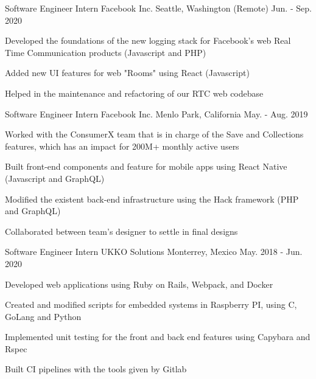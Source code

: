 \begin{cventries}
  \cventry
    {Software Engineer Intern} %
    {Facebook Inc.} %
    {Seattle, Washington (Remote)} %
    {Jun. - Sep. 2020} %
    {
      \begin{cvitems} %
        \item {Developed the foundations of the new logging stack for Facebook's web Real Time Communication products (Javascript and PHP)}
        \item {Added new UI features for web "Rooms" using React (Javascript)}
        \item {Helped in the maintenance and refactoring of our RTC web codebase}
      \end{cvitems}
    }
  \cventry
    {Software Engineer Intern} %
    {Facebook Inc.} %
    {Menlo Park, California} %
    {May. - Aug. 2019} %
    {
      \begin{cvitems} %
        \item {Worked with the ConsumerX team that is in charge of the Save and Collections features, which has an impact for 200M+ monthly active users}
        \item {Built front-end components and feature for mobile apps using React Native (Javascript and GraphQL)}
        \item {Modified the existent back-end infrastructure using the Hack framework (PHP and GraphQL)}
        \item {Collaborated between team's designer to settle in final designs}
      \end{cvitems}
    }
  \cventry
    {Software Engineer Intern} %
    {UKKO Solutions} %
    {Monterrey, Mexico} %
    {May. 2018 - Jun. 2020} %
    {
      \begin{cvitems} %
        \item {Developed web applications using Ruby on Rails, Webpack, and Docker}
        \item {Created and modified scripts for embedded systems in Raspberry PI, using C, GoLang and Python}
        \item {Implemented unit testing for the front and back end features using Capybara and Rspec}
        \item {Built CI pipelines with the tools given by Gitlab}
      \end{cvitems}
    }
\end{cventries}
